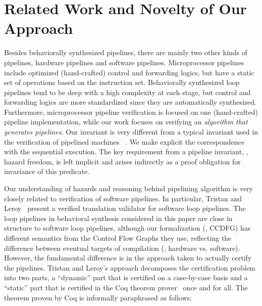 \section{Related Work and Novelty of Our Approach}
\label{sec:related-work}

Besides behaviorally synthesized pipelines, there are mainly two other kinds of pipelines, hardware pipelines and software pipelines. 
Microprocessor pipelines~\cite{pvs,Cyrluk94, bd:pipeline, sh:pipeline} include optimized (hand-crafted)
control and forwarding logics, but have a static set of
operations based on the instruction set. Behaviorally synthesized 
loop pipelines tend to be deep with a high complexity at each stage, but
control and forwarding logics are more standardized since
they are automatically synthesized. 
Furthermore, microprocessor pipeline verification
is focused on one (hand-crafted) pipeline implementation,
while our work focuses on verifying an {\em algorithm
that generates pipelines}. Our invariant is very different from a typical invariant
used in the verification of pipelined machines~\cite{sh:pipeline} . We make explicit the
correspondence with the sequential execution. The key
requirement from a pipeline invariant, \viz, hazard freedom,
is left implicit and arises indirectly as a proof obligation
for invariance of this predicate. 
 
Our understanding of hazards and reasoning behind pipelining algorithm 
is very closely related to verification of software pipelines.  In particular, Tristan
and Leroy~\cite{tl:software-popl10} present a verified
translation validator for software loop pipelines.  The loop
pipelines in behavioral synthesis considered in this paper
are close in structure to software loop pipelines, although
our formalization (\eg, CCDFG) has different semantics from
the Control Flow Graphs they use, reflecting the difference
between eventual targets of compilation (\viz, hardware
vs. software).  However, the fundamental difference is in
the approach taken to actually certify the pipelines.
Tristan and Leroy's approach decomposes the certification
problem into two parts, a ``dynamic'' part that is certified
on a case-by-case basis  and a ``static'' part that is
certified in the Coq theorem prover~\cite{coq} once and for all.  The
theorem proven by Coq is informally paraphrased as follows:

